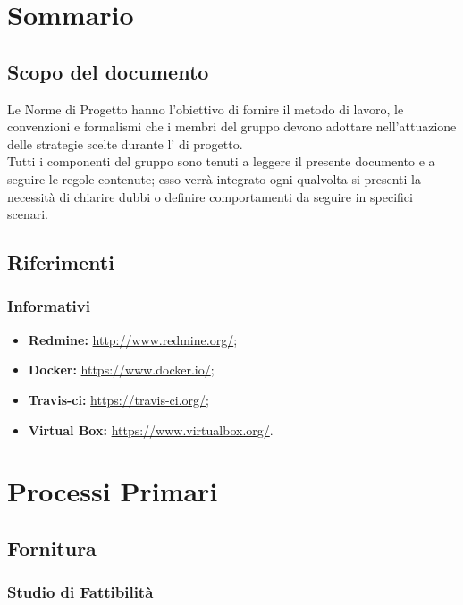\documentclass{scalatekids-article}
\begin{document}
\section{Sommario}

\subsection{Scopo del documento}

Le Norme di Progetto hanno l'obiettivo di fornire il metodo di lavoro, le
convenzioni e formalismi che i membri del gruppo devono adottare nell'attuazione
delle strategie scelte durante l' di progetto. \\
Tutti i componenti del gruppo sono tenuti a leggere il presente documento e a seguire
le regole contenute; esso verrà integrato ogni qualvolta si presenti la necessità di
chiarire dubbi o definire comportamenti da seguire in specifici scenari.

\prodPurpose{}
\glossExpl{}

\subsection{Riferimenti}

\subsubsection{Informativi}

\begin{itemize}
\item\textbf{Redmine:} \url{http://www.redmine.org/};
\item\textbf{Docker:} \url{https://www.docker.io/};
\item\textbf{Travis-ci:} \url{https://travis-ci.org/};
\item\textbf{Virtual Box:} \url{https://www.virtualbox.org/}.
\end{itemize}

\section{Processi Primari}

\subsection{Fornitura}

\subsubsection{Studio di Fattibilità}
\end{document}

